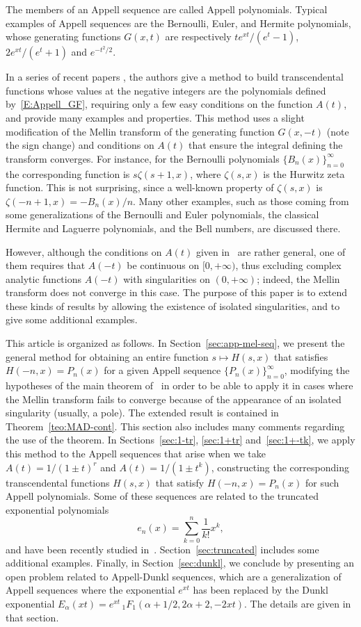 \documentclass[11pt,a4paper]{amsart}
\newcommand{\Ea}{E_{\alpha}}
\theoremstyle{plain}
\theoremstyle{plain}
\theoremstyle{remark}
\numberwithin{equation}{section}
\begin{document}
The members of an Appell sequence are called Appell polynomials. Typical examples of Appell sequences are the Bernoulli, Euler, and Hermite polynomials, whose generating functions $G(x,t)$ are respectively $te^{xt}/(e^t-1)$, $2e^{xt}/(e^t+1)$ and $e^{-t^2/2}$.

In a series of recent papers \cite{NRV, NRV2, NRV3}, the authors give a method to build transcendental functions whose values at the negative integers are the polynomials defined by~\eqref{E:Appell_GF}, requiring only a few easy conditions on the function $A(t)$, and provide many examples and properties. This method uses a slight modification of the Mellin transform of the generating function $G(x,-t)$ (note the sign change) and conditions on $A(t)$ that ensure the integral defining the transform converges. For instance, for the Bernoulli polynomials $\{B_n(x)\}_{n=0}^{\infty}$ the corresponding function is $s\zeta(s+1,x)$, where $\zeta(s,x)$ is the Hurwitz zeta function. This is not surprising, since a well-known property of $\zeta(s,x)$ is $\zeta(-n+1,x) = -B_{n}(x)/n$. Many other examples, such as those coming from some generalizations of the Bernoulli and Euler polynomials, the classical Hermite and Laguerre polynomials, and the Bell numbers, are discussed there.

However, although the conditions on $A(t)$ given in~\cite{NRV} are rather general, one of them requires that $A(-t)$ be continuous on $[0, +\infty)$, thus excluding complex analytic functions $A(-t)$ with singularities on $(0, +\infty)$; indeed, the Mellin transform does not converge in this case. The purpose of this paper is to extend these kinds of results by allowing the existence of isolated singularities, and to give some additional examples.

This article is organized as follows. In Section~\ref{sec:app-mel-seq}, we present the general method for obtaining an entire function $s \mapsto H(s,x)$ that satisfies $H(-n,x) = P_n(x)$ for a given Appell sequence $\{P_n(x)\}_{n=0}^{\infty}$, modifying the hypotheses of the main theorem of~\cite{NRV} in order to be able to apply it in cases where the Mellin transform fails to converge because of the appearance of an isolated singularity (usually, a pole). 
The extended result is contained in Theorem~\ref{teo:MAD-cont}. This section also includes many comments regarding the use of the theorem. 
In Sections~\ref{sec:1-tr}, \ref{sec:1+tr} and~\ref{sec:1+-tk},
we apply this method to the Appell sequences that arise when we take $A(t) = 1/(1\pm t)^r$ and $A(t) = 1/(1\pm t^k)$, constructing the corresponding transcendental functions $H(s,x)$ that satisfy $H(-n,x) = P_n(x)$ for such Appell polynomials. Some of these sequences are related to the truncated exponential polynomials
\[
e_n(x) = \sum_{k=0}^n \frac{1}{k!}x^k,
\]
and have been recently studied in~\cite{DCS, KYA17, M}. 
Section~\ref{sec:truncated} includes some additional examples.
Finally, in Section~\ref{sec:dunkl}, we conclude by presenting an open problem related to Appell-Dunkl sequences, which are a generalization of Appell sequences where the exponential $e^{xt}$ has been replaced by the Dunkl exponential $\Ea(xt) = e^{xt} \,{}_1F_1(\alpha+1/2, 2\alpha + 2, -2xt)$. The details are given in that section.
\end{document}
